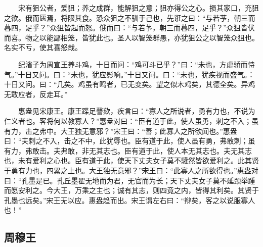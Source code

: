 　　宋有狙公者，爱狙；养之成群，能解狙之意；狙亦得公之心。损其家口，充狙之欲。俄而匮焉，将限其食。恐众狙之不驯于己也，先诳之曰：``与若芧，朝三而暮四，足乎？''众狙皆起而怒。俄而曰：``与若芧，朝三而暮四，足乎？''众狙皆伏而喜。物之以能鄙相笼，皆犹此也。圣人以智笼群愚，亦犹狙公之以智笼众狙也。名实不亏，使其喜怒哉。

　　纪渻子为周宣王养斗鸡，十日而问：``鸡可斗已乎？''曰：``未也，方虚骄而恃气。''十日又问。曰：``未也，犹应影响。''十日又问。曰：``未也，犹疾视而盛气。：十日又问。曰：``几矣。鸡虽有鸣者，已无变矣。望之似木鸡矣，其德全矣。异鸡无敢应者，反走耳。''

　　惠盎见宋康王。康王蹀足謦欬，疾言曰：``寡人之所说者，勇有力也，不说为仁义者也。客将何以教寡人？''惠盎对曰：``臣有道于此，使人虽勇，刺之不入；虽有力，击之弗中。大王独无意邪？''宋王曰：``善；此寡人之所欲闻也。''惠盎曰：``夫刺之不入，击之不中，此犹辱也。臣有道于此，使人虽有勇，弗敢刺；虽有力，弗敢击。夫弗敢，非无其志也。臣有道于此，使人本无其志也。夫无其志也，未有爱利之心也。臣有道于此，使天下丈夫女子莫不驩然皆欲爱利之。此其贤于勇有力也，四累之上也。大王独无意邪？''宋王曰：``此寡人之所欲得也。''惠盎对曰：``孔墨是已。孔丘墨翟无地而为君，无官而为长；天下丈夫女子莫不延颈举踵而愿安利之。今大王，万乘之主也；诚有其志，则四竟之内，皆得其利矣。其贤于孔墨也远矣。''宋王无以应。惠盎趋而出。宋王谓左右曰：``辩矣，客之以说服寡人也！''

\hypertarget{ux5468ux7a46ux738b}{%
\subsection{周穆王}\label{ux5468ux7a46ux738b}}

